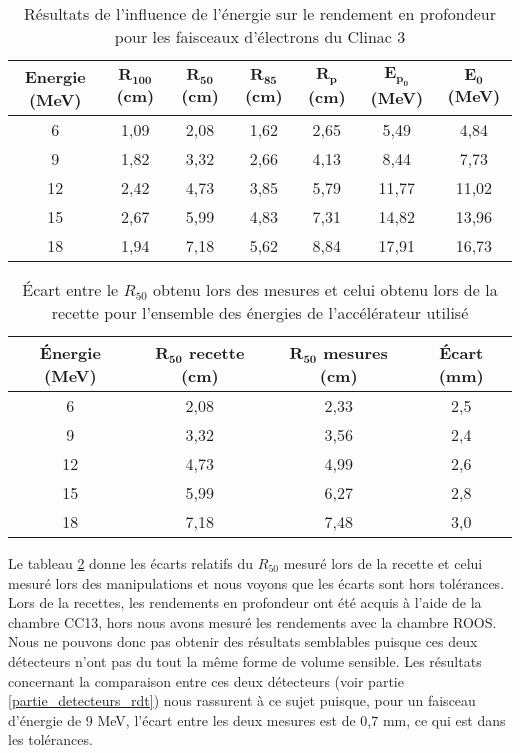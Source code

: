 \documentclass{article}
\begin{document}
\begin{table}[h]
  \centering
  \begin{tabular}{ccccccc}
  \toprule
  \textbf{Energie (MeV)} & $\mathbf{R_{100}}$ \textbf{(cm)} & $\mathbf{R_{50}}$ \textbf{(cm)} & $\mathbf{R_{85}}$ \textbf{(cm)} & $\mathbf{R_p}$ \textbf{(cm)} & $\mathbf{E_{p_0}}$ \textbf{(MeV)} & $\mathbf{E_0}$ \textbf{(MeV)} \\ \toprule
  6 & 1,09 & 2,08 & 1,62 & 2,65 & 5,49 & 4,84 \\
  9 & 1,82 & 3,32 & 2,66 & 4,13 & 8,44 & 7,73 \\
  12 & 2,42 & 4,73 & 3,85 & 5,79 & 11,77 & 11,02 \\
  15 & 2,67 & 5,99 & 4,83 & 7,31 & 14,82 & 13,96 \\
  18 & 1,94 & 7,18 & 5,62 & 8,84 & 17,91 & 16,73 \\ \bottomrule
  \end{tabular}
  \caption{Résultats de l'influence de l'énergie sur le rendement en profondeur pour les faisceaux d'électrons du Clinac 3}
  \label{table_rdt_energies}
\end{table}

\begin{table}[h]
  \centering
  \begin{tabular}{cccc}
    \toprule
    \textbf{Énergie (MeV)} & $\mathbf{R_{50}}$ \textbf{recette (cm)} & $\mathbf{R_{50}}$ \textbf{mesures (cm)} & \textbf{Écart (mm)} \\
    \toprule
    6 & 2,08 & 2,33 & 2,5 \\
    9 & 3,32 & 3,56 & 2,4 \\
    12 & 4,73 & 4,99 & 2,6 \\
    15 & 5,99 & 6,27 & 2,8 \\
    18 & 7,18 & 7,48 & 3,0 \\
    \bottomrule
  \end{tabular}
  \caption{Écart entre le $R_{50}$ obtenu lors des mesures et celui obtenu lors de la recette pour l'ensemble des énergies de l'accélérateur utilisé}
  \label{table_ecarts_R50}
\end{table}

Le tableau \ref*{table_ecarts_R50} donne les écarts relatifs du $R_{50}$ mesuré lors de la recette et celui mesuré lors des manipulations et nous voyons que les écarts sont hors tolérances. Lors de la recettes, les rendements en profondeur ont été acquis à l'aide de la chambre CC13, hors nous avons mesuré les rendements avec la chambre ROOS. Nous ne pouvons donc pas obtenir des résultats semblables puisque ces deux détecteurs n'ont pas du tout la même forme de volume sensible. Les résultats concernant la comparaison entre ces deux détecteurs (voir partie \ref*{partie_detecteurs_rdt}) nous rassurent à ce sujet puisque, pour un faisceau d'énergie de 9 MeV, l'écart entre les deux mesures est de 0,7 mm, ce qui est dans les tolérances.
\end{document}
